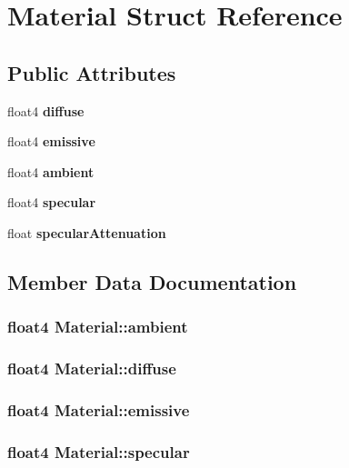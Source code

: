 \section{Material Struct Reference}
\label{struct_material}
\subsection*{Public Attributes}
\begin{DoxyCompactItemize}
\item 
float4 {\bf diffuse}
\item 
float4 {\bf emissive}
\item 
float4 {\bf ambient}
\item 
float4 {\bf specular}
\item 
float {\bf specularAttenuation}
\end{DoxyCompactItemize}


\subsection{Member Data Documentation}
\subsubsection[{ambient}]{\setlength{\rightskip}{0pt plus 5cm}float4 {\bf Material::ambient}}\label{struct_material_ae5a78a4bf0b887ac19dc2791462fed0c}
\subsubsection[{diffuse}]{\setlength{\rightskip}{0pt plus 5cm}float4 {\bf Material::diffuse}}\label{struct_material_a1c55452b2bb7f89198793ed123cf2b77}
\subsubsection[{emissive}]{\setlength{\rightskip}{0pt plus 5cm}float4 {\bf Material::emissive}}\label{struct_material_aeb6810b6c022a1e7b1d3aeed4822c5d5}
\subsubsection[{specular}]{\setlength{\rightskip}{0pt plus 5cm}float4 {\bf Material::specular}}\label{struct_material_a854d31d1218ac21334f2c5bd7b04bae3}
